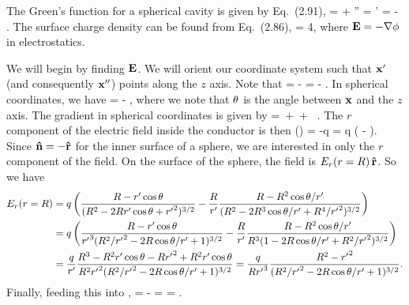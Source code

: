 \begin{solution}
	The Green's function for a spherical cavity is given by Eq.~(2.91),
	\beq
		\Gdxxp =  +   \vx'' = \vx'  \qand \alp = - .
	\eeq
	The surface charge density can be found from Eq.~(2.86),
	\beqn \label{scdeq}
		\vE \cdot \nh = 4\pi \sig,
	\eeqn
	where $\mathbf{E} = -\nabla \phi$ in electrostatics.
	
	We will begin by finding $\mathbf{E}$.  We will orient our coordinate system such that $\mathbf{x}'$ (and consequently $\mathbf{x}''$) points along the $z$ axis.  Note that
	\beq
		\Gdxxp =  - 
		=  - .
	\eeq
	In spherical coordinates, we have
	\beq
		\Gdxxp =  -  ,
	\eeq
	where we note that $\theta$ is the angle between $\mathbf{x}$ and the $z$ axis.  The gradient in spherical coordinates is given by
	\beq
		\nabla =  \,\rh +  \pdv{}{\tht} \,\thh +  \pdv{}{\vph} \, \phh.
	\eeq
	The $r$ component of the electric field inside the conductor is then
	\beq
		\Er(\vx) = -q 
		= q \left(  -   \right).
	\eeq
	Since $\mathbf{\hat{n}} = -\mathbf{\hat{r}}$ for the inner surface of a sphere, we are interested in only the $r$ component of the field.  On the surface of the sphere, the field is $E_r(r=R) \,\mathbf{\hat{r}}$.  So we have
	\begin{align*}
		E_r(r=R) &= q \left( \frac{R - r' \cos\theta}{(R^2 - 2 R r' \cos\theta + {r'}^2)^{3/2}} - \frac{R}{r'} \frac{R - R^2 \cos\theta / r'}{(R^2 - 2 R^3 \cos\theta / r' + R^4 / {r'}^2)^{3/2}} \right) \\
		&= q \left( \frac{R - r' \cos\theta}{{r'}^3 (R^2 / {r'}^2 - 2 R \cos\theta / r' + 1)^{3/2}} - \frac{R}{r'} \frac{R - R^2 \cos\theta / r'}{R^3 (1 - 2 R \cos\theta / r' + R^2 / {r'}^2)^{3/2}} \right) \\
		&= \frac{q}{r'} \frac{R^3 - R^2 r' \cos\theta - R {r'}^2 + R^2 r' \cos\theta}{R^2 {r'}^2 (R^2 / {r'}^2 - 2 R \cos\theta / r' + 1)^{3/2}}
		= \frac{q}{R {r'}^3} \frac{R^2 - {r'}^2}{(R^2 / {r'}^2 - 2 R \cos\theta / r' + 1)^{3/2}}.
	\end{align*}
	Finally, feeding this into ,
	\beq
		\sig = -\frac{\vE \cdot \rh}{4\pi}
		=  
		=  .
	\eeq
\end{solution}
\vfix


